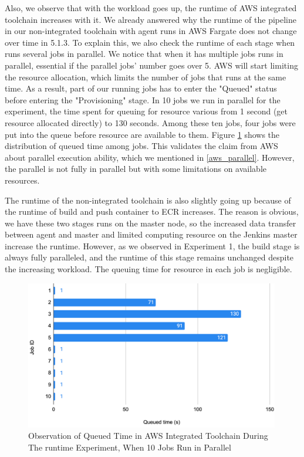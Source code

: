  Also, we observe that with the workload goes up, the runtime of AWS integrated toolchain increases with it. We already answered why the runtime of the pipeline in our non-integrated toolchain with agent runs in AWS Fargate does not change over time in 5.1.3. To explain this, we also check the runtime of each stage when runs several jobs in parallel. We notice that when it has multiple jobs runs in parallel, essential if the parallel jobs' number goes over 5. AWS will start limiting the resource allocation, which limits the number of jobs that runs at the same time. As a result, part of our running jobs has to enter the "Queued" status before entering the "Provisioning" stage. In 10 jobs we run in parallel for the experiment, the time spent for queuing for resource various from 1 second (get resource allocated directly) to 130 seconds. Among these ten jobs, four jobs were put into the queue before resource are available to them. Figure \ref{fig:queued} shows the distribution of queued time among jobs. This validates the claim from AWS about parallel execution ability, which we mentioned in \ref{aws_parallel}. However, the parallel is not fully in parallel but with some limitations on available resources.
 \par
 The runtime of the non-integrated toolchain is also slightly going up because of the runtime of build and push container to ECR increases. The reason is obvious, we have these two stages runs on the master node, so the increased data transfer between agent and master and limited computing resource on the Jenkins master increase the runtime. However, as we observed in Experiment 1, the build stage is always fully paralleled, and the runtime of this stage remains unchanged despite the increasing workload. The queuing time for resource in each job is negligible.
 \begin{figure}[h]
    \centering
    \includegraphics[width=0.99\textwidth]{pics/queued_time.png}
    \caption{Observation of Queued Time in AWS Integrated Toolchain During The runtime Experiment, When 10 Jobs Run in Parallel}
    \label{fig:queued}
    \end{figure}
